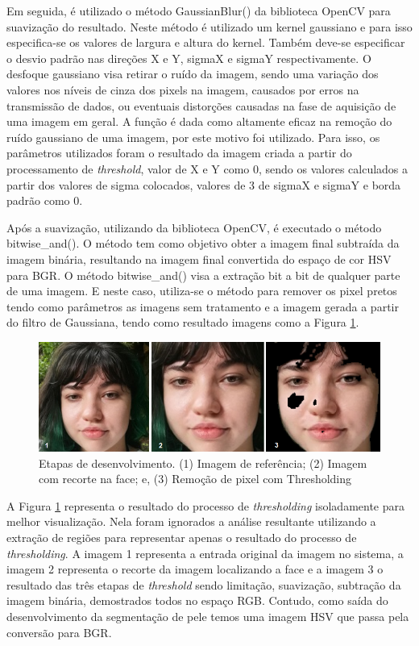 Em seguida, é utilizado o método GaussianBlur() da biblioteca OpenCV para suavização do resultado. Neste método é utilizado um kernel gaussiano e para isso especifica-se os valores de largura e altura do kernel. Também deve-se especificar o desvio padrão nas direções X e Y, sigmaX e sigmaY respectivamente. O desfoque gaussiano visa retirar o ruído da imagem, sendo uma variação dos valores nos níveis de cinza dos pixels na imagem, causados por erros na transmissão de dados, ou eventuais distorções causadas na fase de aquisição de uma imagem em geral. A função é dada como altamente eficaz na remoção do ruído gaussiano de uma imagem, por este motivo foi utilizado. Para isso, os parâmetros utilizados foram o resultado da imagem criada a partir do processamento de \textit{threshold}, valor de X e Y como 0, sendo os valores calculados a partir dos valores de sigma colocados, valores de 3 de sigmaX e sigmaY e borda padrão como 0.

Após a suavização, utilizando da biblioteca OpenCV, é executado o método bitwise\_and(). O método tem como objetivo obter a imagem final subtraída da imagem binária, resultando na imagem final convertida do espaço de cor HSV para BGR. O método bitwise\_and() visa a extração bit a bit de qualquer parte de uma imagem. E neste caso, utiliza-se o método para remover os pixel pretos tendo como parâmetros as imagens sem tratamento e a imagem gerada a partir do filtro de Gaussiana, tendo como resultado imagens como a Figura \ref{fig: Etapas_threshoding}. 

\begin{figure}[h]
\centering
\caption{Etapas de desenvolvimento. (1) Imagem de referência; (2) Imagem com recorte na face; e, (3) Remoção de pixel com Thresholding}
\includegraphics{Template_Latex_TCC-UNIFTEC/_lib/imagens/vittoriatestes.png}

\label{fig: Etapas_threshoding}
\end{figure}

A Figura \ref{fig: Etapas_threshoding} representa o resultado do processo de \textit{thresholding} isoladamente para melhor visualização. Nela foram ignorados a análise resultante utilizando a extração de regiões para representar apenas o resultado do processo de \textit{thresholding}. A imagem 1 representa a entrada original da imagem no sistema, a imagem 2 representa o recorte da imagem localizando a face e a imagem 3 o resultado das três etapas de \textit{ threshold} sendo limitação, suavização, subtração da imagem binária, demostrados todos no espaço RGB. Contudo, como saída do desenvolvimento da segmentação de pele temos uma imagem HSV que passa pela conversão para BGR.

